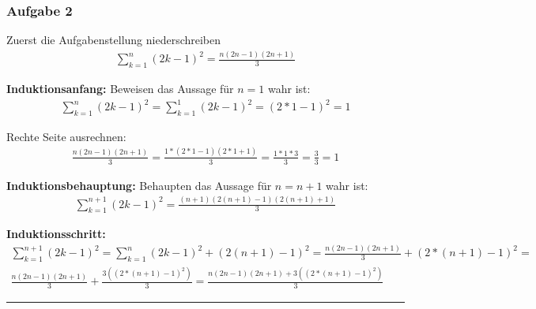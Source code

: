 \documentclass{article}
\begin{document}
\subsubsection{Aufgabe 2}


\noindent Zuerst die Aufgabenstellung niederschreiben
\begin{align*}
    \sum_{k=1}^{n} (2k - 1)^{2}  = \frac{n(2n - 1)(2n + 1)}{3}
\end{align*}

\noindent \textbf{Induktionsanfang:} Beweisen das Aussage für $ n  = 1 $ wahr ist:
\begin{align*}
    \sum_{k=1}^{n} (2k - 1)^{2}  = \sum_{k=1}^{1} (2k - 1)^{2} =  (2 * 1 - 1)^{2} =  1
\end{align*}

\noindent Rechte Seite ausrechnen:
\begin{align*}
    \frac{n(2n - 1)(2n + 1)}{3} =     \frac{1 * (2 * 1 - 1)(2 * 1 + 1)}{3} = \frac{1 * 1 * 3}{3} = \frac{3}{3} =  1 
\end{align*}



\noindent \textbf{Induktionsbehauptung:} Behaupten das Aussage für $ n =  n + 1 $ wahr ist:
\begin{align*}
    \sum_{k=1}^{n + 1} (2k - 1)^{2}  = \frac{(n + 1)(2 (n + 1) - 1)(2(n + 1) + 1)}{3}
\end{align*}


\noindent \textbf{Induktionsschritt:}
\begin{align*}
    \sum_{k=1}^{n + 1} (2k - 1)^{2} =  \sum_{k=1}^{n} (2k - 1)^{2} + (2(n + 1) - 1)^{2} = \frac{n(2n - 1)(2n + 1)}{3} + (2 * (n + 1) - 1)^2 = \\
     \frac{n(2n - 1)(2n + 1)}{3} + \frac{3((2 * (n + 1) - 1)^2)}{3} = \frac{n(2n - 1)(2n + 1)+ 3((2 * (n + 1) - 1)^2)}{3} 
\end{align*}

\hrule

\begin{align*}
\end{align*}
\end{document}
